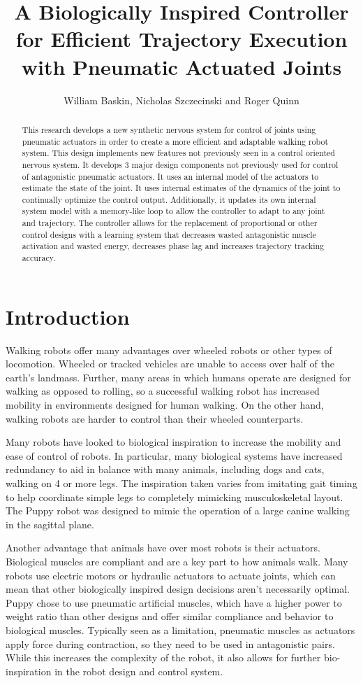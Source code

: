 \documentclass[letterpaper, 10 pt, conference]{IEEEconf} %
\author{William Baskin, Nicholas Szczecinski and Roger Quinn}
\title{
  {A Biologically Inspired Controller for Efficient Trajectory Execution with Pneumatic Actuated Joints}\\
}
\newcommand{\bbs}[1]{\section{#1}}
\begin{document}
\maketitle

\begin{abstract}
\label{chap:abstract}
This research develops a new synthetic nervous system for control of joints using pneumatic actuators in order to create a more efficient and adaptable walking robot system. This design implements new features not previously seen in a control oriented nervous system. It develops 3 major design components not previously used for control of antagonistic pneumatic actuators. It uses an internal model of the actuators to estimate the state of the joint. It uses internal estimates of the dynamics of the joint to continually optimize the control output. Additionally, it updates its own internal system model with a memory-like loop to allow the controller to adapt to any joint and trajectory. The controller allows for the replacement of proportional or other control designs with a learning system that decreases wasted antagonistic muscle activation and wasted energy, decreases phase lag and increases trajectory tracking accuracy.
\end{abstract}

\bbs{Introduction} %
\label{chap:introduction}

Walking robots offer many advantages over wheeled robots or other types
of locomotion. Wheeled or tracked vehicles are unable to access over half
of the earth's landmass. \cite{BigDog} Further, many areas in which humans
operate are designed for walking as opposed to rolling, so a successful walking 
robot has increased mobility in environments designed for human walking. On the
other hand, walking robots are harder to control than their wheeled 
counterparts.

Many robots have looked to biological inspiration to increase the mobility and
ease of control of robots. In particular, many biological systems have increased
redundancy to aid in balance with many animals, including dogs and cats, walking
on 4 or more legs. The inspiration taken varies from imitating gait timing to
help coordinate simple legs to completely mimicking musculoskeletal layout. The
Puppy robot was designed to mimic the operation of a large canine walking in
the sagittal plane. \cite{PuppyDesign}

Another advantage that animals have over most robots is their actuators.
Biological muscles are compliant and are a key part to how animals walk. Many
robots use electric motors or hydraulic actuators to actuate joints, which can
mean that other biologically inspired design decisions aren't necessarily 
optimal. Puppy chose to use pneumatic artificial muscles, which have a higher
power to weight ratio than other designs and offer similar compliance and
behavior to biological muscles. \cite{Tavakoli2008} Typically seen as a 
limitation, pneumatic muscles as actuators apply force during contraction, so 
they need to be used in antagonistic pairs. While this increases the complexity
of the robot, it also allows for further bio-inspiration in the robot design
and control system.
\end{document}
